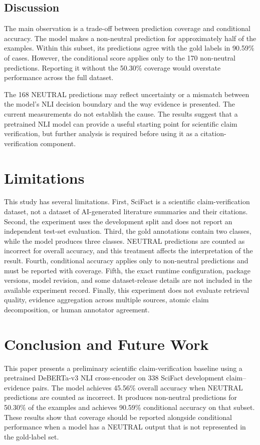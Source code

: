 \documentclass[conference]{IEEEtran}
\begin{document}
\subsection{Discussion}
The main observation is a trade-off between prediction coverage and conditional accuracy. The model makes a non-neutral prediction for approximately half of the examples. Within this subset, its predictions agree with the gold labels in 90.59\% of cases. However, the conditional score applies only to the 170 non-neutral predictions. Reporting it without the 50.30\% coverage would overstate performance across the full dataset.

The 168 NEUTRAL predictions may reflect uncertainty or a mismatch between the model's NLI decision boundary and the way evidence is presented. The current measurements do not establish the cause. The results suggest that a pretrained NLI model can provide a useful starting point for scientific claim verification, but further analysis is required before using it as a citation-verification component.

\section{Limitations}
This study has several limitations. First, SciFact is a scientific claim-verification dataset, not a dataset of AI-generated literature summaries and their citations. Second, the experiment uses the development split and does not report an independent test-set evaluation. Third, the gold annotations contain two classes, while the model produces three classes. NEUTRAL predictions are counted as incorrect for overall accuracy, and this treatment affects the interpretation of the result. Fourth, conditional accuracy applies only to non-neutral predictions and must be reported with coverage. Fifth, the exact runtime configuration, package versions, model revision, and some dataset-release details are not included in the available experiment record. Finally, this experiment does not evaluate retrieval quality, evidence aggregation across multiple sources, atomic claim decomposition, or human annotator agreement.

\section{Conclusion and Future Work}
This paper presents a preliminary scientific claim-verification baseline using a pretrained DeBERTa-v3 NLI cross-encoder on 338 SciFact development claim--evidence pairs. The model achieves 45.56\% overall accuracy when NEUTRAL predictions are counted as incorrect. It produces non-neutral predictions for 50.30\% of the examples and achieves 90.59\% conditional accuracy on that subset. These results show that coverage should be reported alongside conditional performance when a model has a NEUTRAL output that is not represented in the gold-label set.
\end{document}
